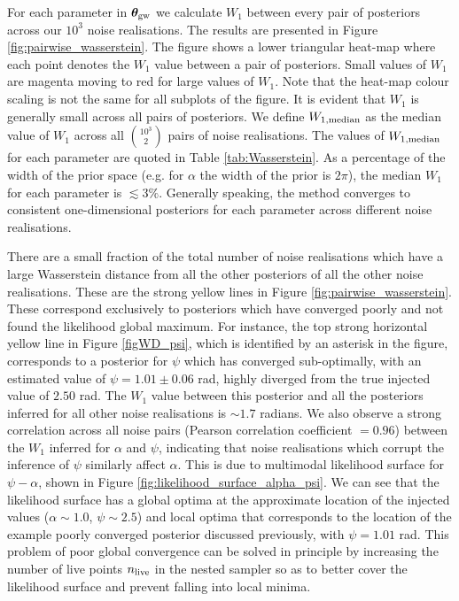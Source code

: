 \documentclass[fleqn,usenatbib,useAMS]{mnras}
\begin{document}
For each parameter in $\boldsymbol{\theta}_{\rm gw}$ we calculate $W_1$ between every pair of posteriors across our $10^3$ noise realisations. The results are presented in Figure \ref{fig:pairwise_wasserstein}. The figure shows a lower triangular heat-map where each point denotes the $W_1$ value between a pair of posteriors. Small values of $W_1$ are magenta moving to red for large values of $W_1$. Note that the heat-map colour scaling is not the same for all subplots of the figure. It is evident that $W_1$ is generally small across all pairs of posteriors. We define $W_{1, \rm median}$ as the median value of $W_1$ across all $10^3 \choose 2$ pairs of noise realisations. The values of $W_{1, \rm median}$ for each parameter are quoted in Table \ref{tab:Wasserstein}. As a percentage of the width of the prior space (e.g. for $\alpha$ the width of the prior is $2 \pi$), the median $W_1$ for each parameter is $\lesssim 3 \%$. Generally speaking, the method converges to consistent one-dimensional posteriors for each parameter across different noise realisations. \newline 

There are a small fraction of the total number of noise realisations which have a large Wasserstein distance from all the other posteriors of all the other noise realisations. These are the strong yellow lines in Figure \ref{fig:pairwise_wasserstein}. These correspond exclusively to posteriors which have converged poorly and not found the likelihood global maximum. For instance, the top strong horizontal yellow line in Figure \ref{figWD_psi}, which is identified by an asterisk in the figure, corresponds to a posterior for $\psi$ which has converged sub-optimally, with an estimated value of $\psi = 1.01 \pm 0.06$ rad, highly diverged from the true injected value of $2.50$ rad. The $W_1$ value between this posterior and all the posteriors inferred for all other noise realisations is $\sim 1.7$ radians. We also observe a strong correlation across all noise pairs (Pearson correlation coefficient $=0.96$) between the $W_1$ inferred for $\alpha$ and $\psi$, indicating that noise realisations which corrupt the inference of $\psi$ similarly affect $\alpha$. This is due to multimodal likelihood surface for $\psi-\alpha$, shown in Figure \ref{fig:likelihood_surface_alpha_psi}. We can see that the likelihood surface has a global optima at the approximate location of the injected values ($\alpha \sim 1.0$, $\psi\sim2.5$) and local optima that corresponds to the location of the example poorly converged posterior discussed previously, with $\psi = 1.01$ rad. This problem of poor global convergence can be solved in principle by increasing the number of live points $n_{\rm live}$ in the nested sampler so as to better cover the likelihood surface and prevent falling into local minima. 
\end{document}
